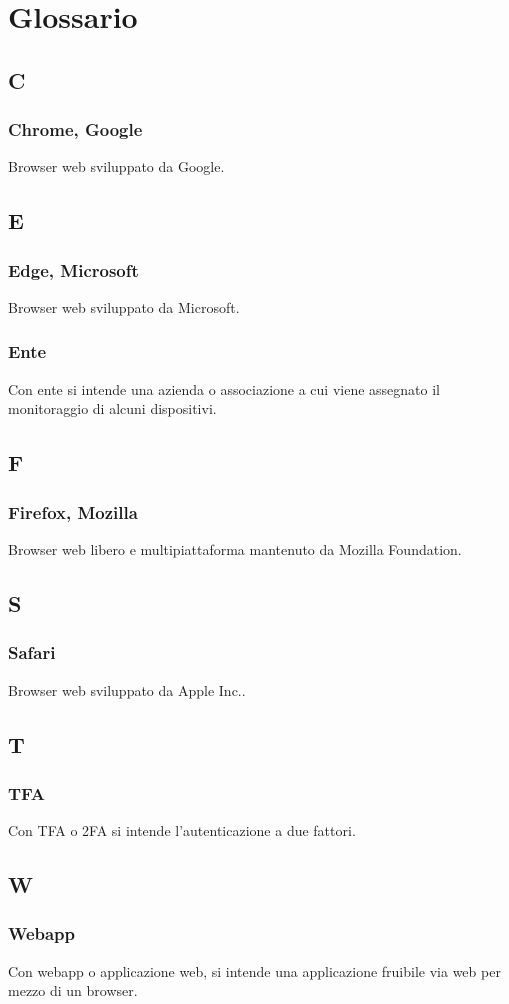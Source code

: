 \appendix
{}

\section{Glossario}
\subsection{C}
\subsubsection*{Chrome, Google}
Browser web sviluppato da Google.
\subsection{E}
\subsubsection*{Edge, Microsoft}
Browser web sviluppato da Microsoft.
\subsubsection*{Ente}
Con ente si intende una azienda o associazione a cui viene assegnato il monitoraggio di alcuni dispositivi.
\subsection{F}
\subsubsection*{Firefox, Mozilla}
Browser web libero e multipiattaforma mantenuto da Mozilla Foundation.
\subsection{S}
\subsubsection*{Safari}
Browser web sviluppato da Apple Inc.. 
\subsection{T}
\subsubsection*{TFA}
Con TFA o 2FA si intende l'autenticazione a due fattori.
\subsection{W}
\subsubsection*{Webapp}
Con webapp o applicazione web, si intende una applicazione fruibile via web per mezzo di un browser.